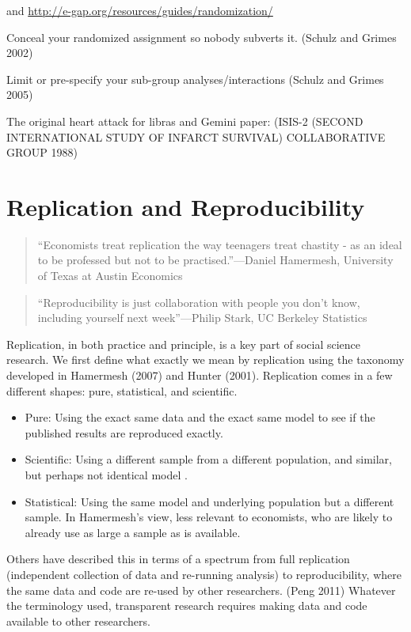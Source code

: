 \documentclass[12pt] {article}
\begin{document}
and \url{http://e-gap.org/resources/guides/randomization/}

Conceal your randomized assignment so nobody subverts it. (Schulz and
Grimes 2002)

Limit or pre-specify your sub-group analyses/interactions (Schulz and
Grimes 2005)

The original heart attack for libras and Gemini paper: (ISIS-2 (SECOND
INTERNATIONAL STUDY OF INFARCT SURVIVAL) COLLABORATIVE GROUP 1988)


\section{Replication and
Reproducibility}\label{replication-and-reproducibility}

\begin{quote}
``Economists treat replication the way teenagers treat chastity - as an
ideal to be professed but not to be practised.''---Daniel Hamermesh,
University of Texas at Austin Economics
\end{quote}

\begin{quote}
``Reproducibility is just collaboration with people you don't know,
including yourself next week''---Philip Stark, UC Berkeley Statistics
\end{quote}

Replication, in both practice and principle, is a key part of social
science research. We first define what exactly we mean by replication
using the taxonomy developed in Hamermesh (2007) and Hunter (2001).
Replication comes in a few different shapes: pure, statistical, and
scientific.

\begin{itemize}
\item
  Pure: Using the exact same data and the exact same model to see if the
  published results are reproduced exactly.
\item
  Scientific: Using a different sample from a different population, and
  similar, but perhaps not identical model .
\item
  Statistical: Using the same model and underlying population but a
  different sample. In Hamermesh's view, less relevant to economists,
  who are likely to already use as large a sample as is available.
\end{itemize}

Others have described this in terms of a spectrum from full replication
(independent collection of data and re-running analysis) to
reproducibility, where the same data and code are re-used by other
researchers. (Peng 2011) Whatever the terminology used, transparent
research requires making data and code available to other researchers.
\end{document}
